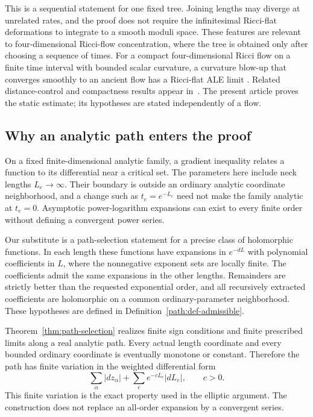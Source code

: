 This is a sequential statement for one fixed tree. Joining lengths may
diverge at unrelated rates, and the proof does not require the
infinitesimal Ricci-flat deformations to integrate to a smooth moduli
space. These features are relevant to four-dimensional Ricci-flow
concentration, where the tree is obtained only after choosing a sequence
of times. For a compact four-dimensional Ricci flow on a finite time interval
with bounded scalar curvature, a curvature blow-up that converges
smoothly to an ancient flow has a Ricci-flat ALE limit
\cite[arXiv version, Corollary~1.9]{BamlerZhangI}.
Related distance-control and compactness results appear
in~\cite{BamlerZhangII,BamlerConvergence}. The present article proves
the static estimate; its hypotheses are stated independently of a flow.

\subsection{Why an analytic path enters the proof}

On a fixed finite-dimensional analytic family, a gradient inequality
relates a function to its differential near a critical set. The
parameters here include neck lengths $L_e\to\infty$. Their boundary
is outside an ordinary analytic coordinate neighborhood, and a change
such as $t_e=e^{-L_e}$ need not make the family analytic at $t_e=0$.
Asymptotic power-logarithm expansions can exist to every finite order
without defining a convergent power series.

Our substitute is a path-selection statement for a precise class of
holomorphic functions. In each length these functions have expansions
in $e^{-dL}$ with polynomial coefficients in $L$, where the
nonnegative exponent sets are locally finite. The coefficients admit
the same expansions in the other lengths. Remainders are strictly
better than the requested exponential order, and all recursively
extracted coefficients are holomorphic on a common ordinary-parameter
neighborhood. These hypotheses are defined in
Definition~\ref{path:def-admissible}.

Theorem~\ref{thm:path-selection} realizes finite sign conditions and
finite prescribed limits along a real analytic path. Every actual
length coordinate and every bounded ordinary coordinate is eventually
monotone or constant. Therefore the path has finite variation in the
weighted differential form
\[
 \sum_\alpha |dz_\alpha|+\sum_e e^{-cL_e}|dL_e|,
 \qquad c>0.
\]
This finite variation is the exact property used in the elliptic
argument. The construction does not replace an all-order expansion
by a convergent series.

